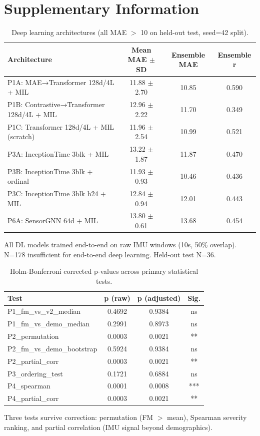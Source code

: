 \documentclass[11pt]{article}
\begin{document}
\section*{Supplementary Information}
\begin{table}[H]
\centering
\caption{Deep learning architectures (all MAE $>$ 10 on held-out test, seed=42 split).}
\label{tab:dl}
\begin{tabular}{lccc}
\toprule
Architecture & Mean MAE $\pm$ SD & Ensemble MAE & Ensemble r \\
\midrule
P1A: MAE→Transformer 128d/4L + MIL & 11.88 $\pm$ 2.70 & 10.85 & 0.590 \\
P1B: Contrastive→Transformer 128d/4L + MIL & 12.96 $\pm$ 2.22 & 11.70 & 0.349 \\
P1C: Transformer 128d/4L + MIL (scratch) & 11.96 $\pm$ 2.54 & 10.99 & 0.521 \\
P3A: InceptionTime 3blk + MIL & 13.22 $\pm$ 1.87 & 11.87 & 0.470 \\
P3B: InceptionTime 3blk + ordinal & 11.93 $\pm$ 0.93 & 10.46 & 0.436 \\
P3C: InceptionTime 3blk h24 + MIL & 12.84 $\pm$ 0.94 & 12.01 & 0.443 \\
P6A: SensorGNN 64d + MIL & 13.80 $\pm$ 0.61 & 13.68 & 0.454 \\
\bottomrule
\end{tabular}

\smallskip
\footnotesize{All DL models trained end-to-end on raw IMU windows (10s, 50\% overlap). N=178 insufficient for end-to-end deep learning. Held-out test N=36.}
\end{table}
\begin{table}[H]
\centering
\caption{Holm-Bonferroni corrected p-values across primary statistical tests.}
\label{tab:holm}
\begin{tabular}{lccc}
\toprule
Test & p (raw) & p (adjusted) & Sig. \\
\midrule
P1\_fm\_vs\_v2\_median & 0.4692 & 0.9384 & ns \\
P1\_fm\_vs\_demo\_median & 0.2991 & 0.8973 & ns \\
P2\_permutation & 0.0003 & 0.0021 & ** \\
P2\_fm\_vs\_demo\_bootstrap & 0.5924 & 0.9384 & ns \\
P2\_partial\_corr & 0.0003 & 0.0021 & ** \\
P3\_ordering\_test & 0.1721 & 0.6884 & ns \\
P4\_spearman & 0.0001 & 0.0008 & *** \\
P4\_partial\_corr & 0.0003 & 0.0021 & ** \\
\bottomrule
\end{tabular}

\smallskip
\footnotesize{Three tests survive correction: permutation (FM $>$ mean), Spearman severity ranking, and partial correlation (IMU signal beyond demographics).}
\end{table}
\end{document}
